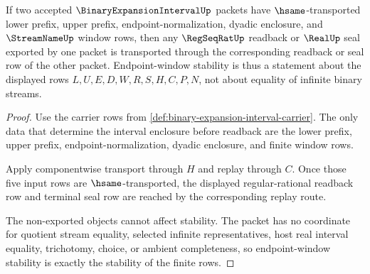 \begin{theorem}
\label{thm:binary-expansion-interval-endpoint-window-stability}
If two accepted $\BinaryExpansionIntervalUp$ packets have $\hsame$-transported lower prefix, upper prefix, endpoint-normalization, dyadic enclosure, and $\StreamNameUp$ window rows, then any $\RegSeqRatUp$ readback or $\RealUp$ seal exported by one packet is transported through the corresponding readback or seal row of the other packet. Endpoint-window stability is thus a statement about the displayed rows $L,U,E,D,W,R,S,H,C,P,N$, not about equality of infinite binary streams.
\end{theorem}
\begin{proof}
Use the carrier rows from \autoref{def:binary-expansion-interval-carrier}. The only data that determine the interval enclosure before readback are the lower prefix, upper prefix, endpoint-normalization, dyadic enclosure, and finite window rows.

Apply componentwise transport through $H$ and replay through $C$. Once those five input rows are $\hsame$-transported, the displayed regular-rational readback row and terminal seal row are reached by the corresponding replay route.

The non-exported objects cannot affect stability. The packet has no coordinate for quotient stream equality, selected infinite representatives, host real interval equality, trichotomy, choice, or ambient completeness, so endpoint-window stability is exactly the stability of the finite rows.
\end{proof}


\begin{closurestatus}{\BinaryExpansionIntervalUp}
  \theoryclosure{\seedClosure}
  \formalstatus{\unformalizedV}
\end{closurestatus}

